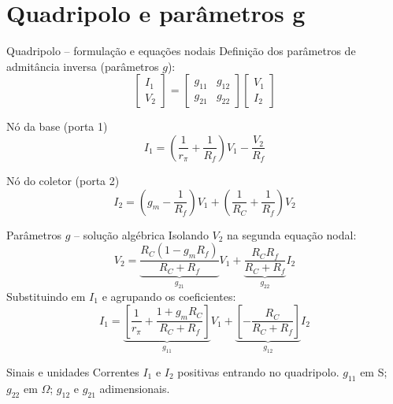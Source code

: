 \documentclass[aspectratio=169,11pt]{beamer}
\begin{document}
\section{Quadripolo e parâmetros g}


\begin{frame}{Quadripolo -- formulação e equações nodais}
  \small
  Definição dos parâmetros de admitância inversa (parâmetros $g$):
  \[
  \begin{bmatrix} I_1\\ V_2\end{bmatrix}=
  \begin{bmatrix} g_{11}&g_{12}\\g_{21}&g_{22}\end{bmatrix}
  \begin{bmatrix} V_1\\I_2\end{bmatrix}
  \]
  \begin{block}{Nó da base (porta 1)}
  \[
  \boxed{I_1=\left(\frac{1}{r_\pi}+\frac{1}{R_f}\right)V_1-\frac{V_2}{R_f}}
  \]
  \end{block}
  \begin{block}{Nó do coletor (porta 2)}
  \[
  \boxed{I_2=\left(g_m-\frac{1}{R_f}\right)V_1+\left(\frac{1}{R_C}+\frac{1}{R_f}\right)V_2}
  \]
  \end{block}
\end{frame}



\begin{frame}{Parâmetros $g$ -- solução algébrica}
  \small
  Isolando $V_2$ na segunda equação nodal:
  \[
  V_2=\underbrace{\frac{R_C(1-g_mR_f)}{R_C+R_f}}_{g_{21}}V_1
  +\underbrace{\frac{R_CR_f}{R_C+R_f}}_{g_{22}}I_2
  \]
  Substituindo em $I_1$ e agrupando os coeficientes:
  \[
  I_1=\underbrace{\left[\frac{1}{r_\pi}+\frac{1+g_mR_C}{R_C+R_f}\right]}_{g_{11}}V_1
  +\underbrace{\left[-\frac{R_C}{R_C+R_f}\right]}_{g_{12}}I_2
  \]
  \begin{block}{Sinais e unidades}
  \scriptsize Correntes $I_1$ e $I_2$ positivas entrando no quadripolo.
  $g_{11}$ em S; $g_{22}$ em $\Omega$; $g_{12}$ e $g_{21}$ adimensionais.
  \end{block}
\end{frame}


\end{document}

